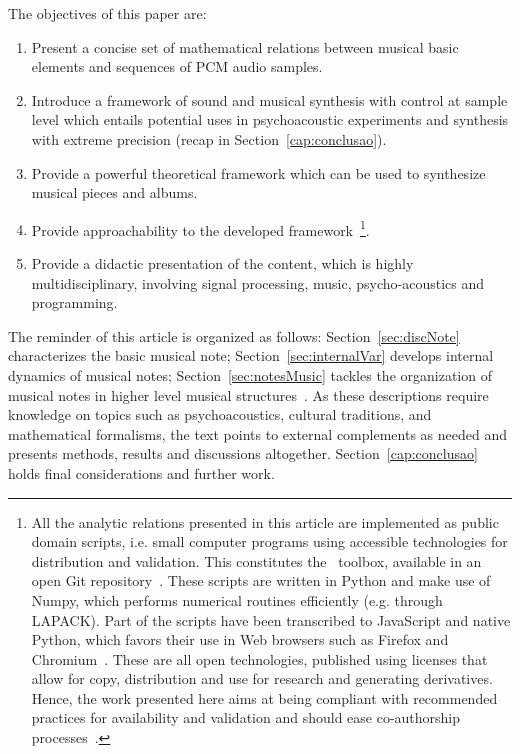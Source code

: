 The objectives of this paper are:
\begin{enumerate}
	\item Present a concise set of mathematical relations between musical basic elements and sequences of PCM audio samples.
	\item Introduce a framework of sound and musical synthesis with control at sample level which entails potential uses in psychoacoustic experiments and synthesis with extreme precision (recap in Section~\ref{cap:conclusao}).
	\item Provide a powerful theoretical framework which can be used to synthesize musical pieces and albums.
	\item Provide approachability to the developed framework~\footnote{All
		the analytic relations presented in this article are implemented as public domain scripts,
		i.e. small computer programs using accessible technologies for distribution and validation.
		This constitutes the \massa\ toolbox, available in an open Git repository~\cite{gitBook}.
		These scripts are written in Python and make use of Numpy,
		which performs numerical routines efficiently (e.g. through LAPACK).
		Part of the scripts have been transcribed to JavaScript and native Python,
		which favors their use in Web browsers such as Firefox and
		Chromium~\cite{numpy, audiolab, tutpython, python}.
		These are all open technologies, published using licenses that allow for copy,
		distribution and use for research and generating derivatives.
		Hence, the work presented here aims at being compliant with recommended
		practices for availability and validation
		and should ease co-authorship processes~\cite{Raymond,Lessig}.}.
	\item Provide a didactic presentation of the content, which is highly multidisciplinary,
		involving signal processing, music, psycho-acoustics and programming.
\end{enumerate}

The reminder of this article is organized as follows:
Section~\ref{sec:discNote} characterizes the basic musical note;
Section~\ref{sec:internalVar} develops internal dynamics of musical notes;
Section~\ref{sec:notesMusic} tackles the organization of musical notes in
higher level musical structures~\cite{Wisnick,Webern,Lerdahl,Cook,Lacerda,Zamacois,Schoenberg,microsound}.
As these descriptions require knowledge on topics such as psychoacoustics, cultural traditions,
and mathematical formalisms, the text points to external complements as needed
and presents methods, results and discussions altogether.
Section~\ref{cap:conclusao} holds final considerations and further work.

